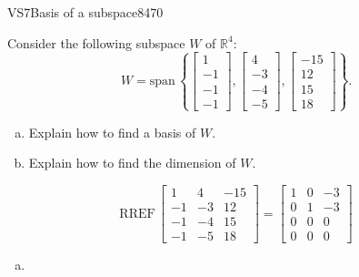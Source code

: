 \begin{exercise}{VS7}{Basis of a subspace}{8470} 
\begin{exerciseStatement} 

 Consider the following subspace \(W\) of \(\mathbb R^4\): \[W=\mathrm{span}\,\left\{ \left[\begin{array}{c}
1 \\
-1 \\
-1 \\
-1
\end{array}\right] , \left[\begin{array}{c}
4 \\
-3 \\
-4 \\
-5
\end{array}\right] , \left[\begin{array}{c}
-15 \\
12 \\
15 \\
18
\end{array}\right] \right\}.\] 

 

\begin{enumerate}[(a)]
\item 

Explain how to find a basis of \(W\).


\item 

Explain how to find the dimension of \(W\).


\end{enumerate}

     \end{exerciseStatement}
 \begin{exerciseAnswer} 

\[\mathrm{RREF}\,\left[\begin{array}{ccc}
1 & 4 & -15 \\
-1 & -3 & 12 \\
-1 & -4 & 15 \\
-1 & -5 & 18
\end{array}\right]=\left[\begin{array}{ccc}
1 & 0 & -3 \\
0 & 1 & -3 \\
0 & 0 & 0 \\
0 & 0 & 0
\end{array}\right]\]

 

\begin{enumerate}[(a)]
\item 


\end{enumerate}
\end{exerciseAnswer}
\end{exercise}
